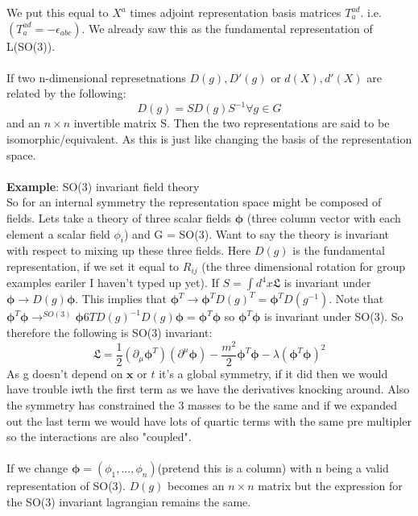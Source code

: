 \documentclass{article}
\begin{document}
{$$$$
We put this equal to $X^a$ times adjoint representation basis matrices $T_a^{ad}$. i.e. $(T_a^{ad} = - \epsilon_{abc})$. We already saw this as the fundamental representation of L(SO(3)).\\\\
If two n-dimensional represetnations $D(g), D'(g)$ or $d(X), d'(X)$ are related by the following:
$$
D(g) = SD(g)S^{-1} \forall g \in G
$$
and an $n\times n$ invertible matrix S. Then the two representations are said to be isomorphic/equivalent. As this is just like changing the basis of the representation space. \\\\
\textbf{Example}: SO(3) invariant field theory\\
So for an internal symmetry the representation space might be composed of fields. Lets take a theory of three scalar fields $\bm \phi$ (three column vector with each element a scalar field $\phi_i$) and G = SO(3). Want to say the theory is invariant with respect to mixing up these three fields. Here $D(g)$ is the fundamental representation, if we set it equal to $R_{ij}$ (the three dimensional rotation for group examples eariler I haven't typed up yet). If $S = \int d^4 x \mathfrak{L}$ is invariant under $\bm \phi \rightarrow D(g) \bm \phi$. This implies that $\bm \phi^T \rightarrow \bm \phi^T D(g)^T = \bm \phi^T D(g^{-1})$. Note that $\bm \phi^T\bm \phi \rightarrow^{SO(3)} \bm \phi6T D(g)^{-1}D(g)\bm \phi = \bm \phi^T \bm \phi$ so $\bm \phi^T \bm \phi$ is invariant under SO(3). So therefore the following is SO(3) invariant:
$$
\mathfrak{L} = \frac{1}{2}(\partial_{\mu} \bm \phi^T) (\partial^{\mu} \bm \phi) - \frac{m^2}{2} \bm \phi^T \bm \phi - \lambda (\bm \phi^T \bm \phi)^2
$$
As g doesn't depend on $\bm x$ or $t$ it's a global symmetry, if it did then we would have trouble iwth the first term as we have the derivatives knocking around. Also the symmetry has constrained the 3 masses to be the same and if we expanded out the last term we would have lots of quartic terms with the same pre multipler so the interactions are also "coupled".\\\\
If we change $\bm \phi = (\phi_1, ..., \phi_n)$(pretend this is a column) with \bm n being a valid representation of SO(3). $D(g)$ becomes an $n\times n$ matrix but the expression for the SO(3) invariant lagrangian remains the same.
}
\end{document}
